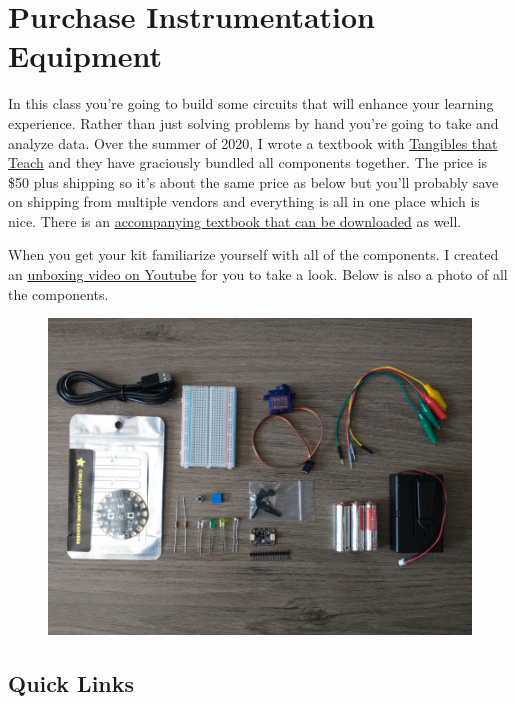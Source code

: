 \newpage

\section{Purchase Instrumentation Equipment}

In this class you’re going to build some circuits that will enhance
your learning experience. Rather than just solving problems by hand
you’re going to take and analyze data. Over the summer of 2020, I
wrote a textbook with
\href{https://www.tangiblesthatteach.com/shop}{Tangibles that Teach}
and they have graciously 
bundled all components together. The price is \$50 plus shipping so
it’s about the same price as below but you’ll probably save on
shipping from multiple vendors and everything is all in one place
which is nice. There is an
\href{https://www.tangiblesthatteach.com/downloads}{accompanying textbook that can be downloaded} as well. 

When you get your kit familiarize yourself with all of the
components. I created an
\href{https://youtu.be/6sNNQrhnzLE}{unboxing video on Youtube} for you
to take a look. Below is also a photo of all the components.
\begin{figure}[H]
  \begin{center}
    \includegraphics[width=\textwidth]{Figures/components.png}
  \end{center}
\end{figure}

\subsection{Quick Links}

